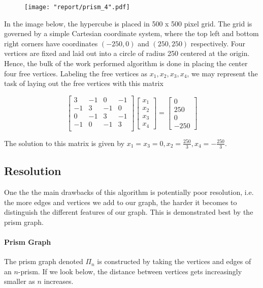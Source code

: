 \documentclass[11pt]{article}
\begin{document}
\begin{figure}[H]
    \texttt{[image: "report/prism\_4".pdf]}
\end{figure}

In the image below, the hypercube is placed in 500 x 500 pixel grid. The grid is governed by a simple Cartesian coordinate system, where the top left and bottom right corners have coordinates $(-250, 0)$ and $(250, 250)$ respectively. Four vertices are fixed and laid out into a circle of radius 250 centered at the origin. Hence, the bulk of the work performed algorithm is done in placing the center four free vertices. Labeling the free vertices as $x_1, x_2, x_3, x_4$, we may represent the task of laying out the free vertices with this matrix

\[
\begin{bmatrix}
    3 & -1 & 0 & -1 \\
    -1 & 3 & -1 & 0 \\
    0 & -1 & 3 & -1 \\
    -1 & 0 & -1 & 3 \\
\end{bmatrix}
\begin{bmatrix} x_1 \\ x_2 \\ x_3 \\ x_4 \end{bmatrix} =
\begin{bmatrix} 0 \\ 250 \\ 0 \\ -250 \end{bmatrix}
\]

The solution to this matrix is given by $x_1 = x_3 = 0, x_2 = \frac{250}{3}, x_4 = -\frac{250}{3}$.

\subsection{Resolution}
One the the main drawbacks of this algorithm is potentially poor resolution, i.e. the more edges and vertices we add to our graph, the harder it becomes to distinguish the different features of our graph. This is demonstrated best by the prism graph.

\paragraph{Prism Graph}
The prism graph denoted $\Pi_{n}$ is constructed by taking the vertices and edges of an $n$-prism. If we look below, the distance between vertices gets increasingly smaller as $n$ increases.
\end{document}
